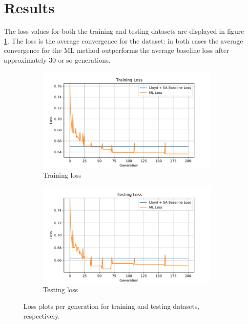 \documentclass{article}
\begin{document}
\section{Results}
The loss values for both the training and testing datasets are displayed in figure \ref{fig:loss}.  The loss is the average convergence for the dataset: in both cases the average convergence for the ML method outperforms the average baseline loss after approximately 30 or so generations.
\begin{figure}[h]
  \centering
  \begin{subfigure}[t]{0.49\textwidth}
    \centering
    \includegraphics[width=\textwidth]{train_loss.pdf}
    \caption{Training loss}
  \end{subfigure}
  \hfill
  \begin{subfigure}[t]{0.49\textwidth}
    \centering
    \includegraphics[width=\textwidth]{test_loss.pdf}
    \caption{Testing loss}
  \end{subfigure}
  \caption{Loss plots per generation for training and testing datasets, respectively.}
  \label{fig:loss}
\end{figure}
\end{document}
